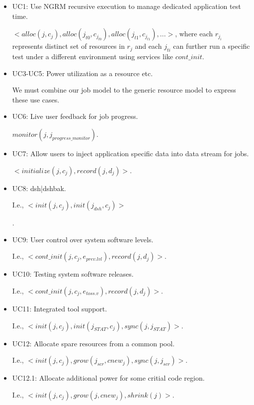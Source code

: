 \documentclass[10pt]{article}
\begin{document}
\begin{itemize}

\item{UC1: Use NGRM recursive execution to manage dedicated application test time. 

$<alloc(j, c_j), alloc(j_{t0}, c_{j_{t0}}), alloc(j_{t1}, c_{j_{t1}}), ...>$, where each $r_{j_i}$ represents distinct set of resources in $r_{j}$ and each $j_{ti}$ can further run a specific test under a different environment using services like $cont\_init$.}

\item{UC3-UC5: Power utilization as a resource etc. 

We must combine our job model to the generic resource model to express these use cases.}

\item{UC6: Live user feedback for job progress. 

$monitor(j, j_{progress\_monitor})$.} 

\item{UC7: Allow users to inject application specific data into data stream for jobs. 

$<initialize(j, c_j), record(j, d_j)>$.} 

\item{UC8: dsh|dshbak. 

I.e., $<init(j, c_j), init(j_{dsh}, c_j)>$}. 

\item{UC9: User control over system software levels. 

I.e., $<cont\_init(j, c_j, e_{prev.lvl}), record(j, d_j)>$.}

\item{UC10: Testing system software releases. 

I.e., $<cont\_init(j, c_j,e_{toss.v}), record(j, d_j)>$.} 

\item{UC11: Integrated tool support. 

I.e., $<init(j, c_j), init(j_{STAT}, c_j), sync(j, j_{STAT})>$.} 

\item{UC12: Allocate spare resources from a common pool. 

I.e., $<init(j, c_j), grow(j_{scr}, cnew_j), sync(j, j_{scr})>$.} 

\item{UC12.1: Allocate additional power for some critial code region. 

I.e., $<init(j, c_j), grow(j, cnew_j), shrink(j)>$.} 


\end{itemize}
\end{document}
